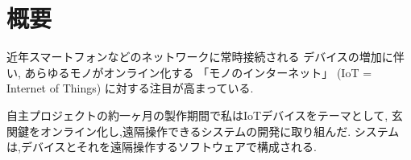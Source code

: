 \section{概要}
近年スマートフォンなどのネットワークに常時接続される
デバイスの増加に伴い, あらゆるモノがオンライン化する
「モノのインターネット」 (IoT = Internet of Things)
に対する注目が高まっている.~\cite{intro-iot}

自主プロジェクトの約一ヶ月の製作期間で私はIoTデバイスをテーマとして,
玄関鍵をオンライン化し,遠隔操作できるシステムの開発に取り組んだ.
システムは,デバイスとそれを遠隔操作するソフトウェアで構成される.

